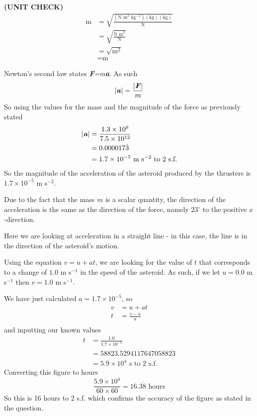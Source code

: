 \documentclass[a4paper,12pt]{article}
\numberwithin{equation}{section}
\begin{document}
\begin{question}
\textbf{(UNIT CHECK)}
\begin{align*}
\text{m}&=\sqrt{\frac{(\text{N m}^2\text{ kg}^{-2})(\text{kg})(\text{kg})}{\text{N}}}\\
&=\sqrt{\frac{\text{N m}^2}{\text{N}}}\\
&=\sqrt{\text{m}^2}\\
&= \text{m}
\end{align*}

\qpart

\qsubpart
Newton's second law states \textit{\textbf{F}=m\textbf{a}}. As such
\[
|\textbf{\textit{a}}| = \frac{|\textbf{\textit{F}}|}{m}
\]
So using the values for the mass and the magnitude of the force as previously stated
\begin{align*}
|\textbf{\textit{a}}|&=\frac{1.3 \times 10^8}{7.5 \times 10^{12}}\\
&=0.000017\dot{3}\\
&=1.7\times 10^{-5} \text{ m s}^{-2}\text{ to 2 s.f.}
\end{align*}
So the magnitude of the acceleration of the asteroid produced by the thrusters is $1.7\times 10^{-5}$ m s$^{-2}$.

Due to the fact that the mass $m$  is a scalar quantity, the direction of the acceleration is the same as the direction of the force, namely $23^\circ$ to the positive $x$-direction.

\qsubpart
Here we are looking at acceleration in a straight line - in this case, the line is in the direction of the asteroid's motion. 

Using the equation $v=u+at$, we are looking for the value of $t$ that corresponds to a change of $1.0$ m s$^{-1}$ in the speed of the asteroid. As such, if we let $u=0.0$ m s$^{-1}$ then $v=1.0$ m s$^{-1}$.

We have just calculated $a=1.7\times10^{-5}$, so
\begin{align*}
v &= u + at\\
t &= \frac{v-u}{a}\\
\end{align*}
and inputting our known values
\begin{align*}
t &=\frac{1.0}{1.7\times10^{-5}}\\
&=58823.\dot{5}29411764705882\dot{3}\\
&=5.9\times10^4\text{ s to 2 s.f.}
\end{align*}
Converting this figure to hours
\[
\frac{5.9\times10^4}{60\times60}=16.3\dot8 \text{ hours}
\]
So this is 16 hours to 2 s.f. which confirms the accuracy of the figure as stated in the question.
\end{question}
\end{document}
